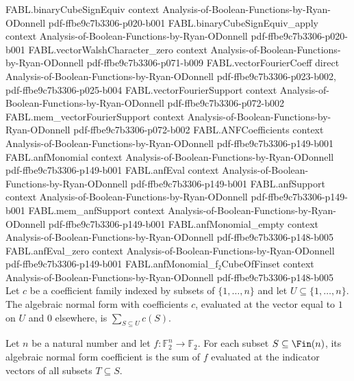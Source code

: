 \begin{theorem}
\proofstep
  {FABL.binaryCubeSignEquiv}
  {context}
  {Analysis-of-Boolean-Functions-by-Ryan-ODonnell}
  {pdf-ffbe9c7b3306-p020-b001}
\proofstep
  {FABL.binaryCubeSignEquiv_apply}
  {context}
  {Analysis-of-Boolean-Functions-by-Ryan-ODonnell}
  {pdf-ffbe9c7b3306-p020-b001}
\proofstep
  {FABL.vectorWalshCharacter_zero}
  {context}
  {Analysis-of-Boolean-Functions-by-Ryan-ODonnell}
  {pdf-ffbe9c7b3306-p071-b009}
\proofstep
  {FABL.vectorFourierCoeff}
  {direct}
  {Analysis-of-Boolean-Functions-by-Ryan-ODonnell}
  {pdf-ffbe9c7b3306-p023-b002,
    pdf-ffbe9c7b3306-p025-b004}
\proofstep
  {FABL.vectorFourierSupport}
  {context}
  {Analysis-of-Boolean-Functions-by-Ryan-ODonnell}
  {pdf-ffbe9c7b3306-p072-b002}
\proofstep
  {FABL.mem_vectorFourierSupport}
  {context}
  {Analysis-of-Boolean-Functions-by-Ryan-ODonnell}
  {pdf-ffbe9c7b3306-p072-b002}
\proofstep
  {FABL.ANFCoefficients}
  {context}
  {Analysis-of-Boolean-Functions-by-Ryan-ODonnell}
  {pdf-ffbe9c7b3306-p149-b001}
\proofstep
  {FABL.anfMonomial}
  {context}
  {Analysis-of-Boolean-Functions-by-Ryan-ODonnell}
  {pdf-ffbe9c7b3306-p149-b001}
\proofstep
  {FABL.anfEval}
  {context}
  {Analysis-of-Boolean-Functions-by-Ryan-ODonnell}
  {pdf-ffbe9c7b3306-p149-b001}
\proofstep
  {FABL.anfSupport}
  {context}
  {Analysis-of-Boolean-Functions-by-Ryan-ODonnell}
  {pdf-ffbe9c7b3306-p149-b001}
\proofstep
  {FABL.mem_anfSupport}
  {context}
  {Analysis-of-Boolean-Functions-by-Ryan-ODonnell}
  {pdf-ffbe9c7b3306-p149-b001}
\proofstep
  {FABL.anfMonomial_empty}
  {context}
  {Analysis-of-Boolean-Functions-by-Ryan-ODonnell}
  {pdf-ffbe9c7b3306-p148-b005}
\proofstep
  {FABL.anfEval_zero}
  {context}
  {Analysis-of-Boolean-Functions-by-Ryan-ODonnell}
  {pdf-ffbe9c7b3306-p149-b001}
\proofstep
  {FABL.anfMonomial_f₂CubeOfFinset}
  {context}
  {Analysis-of-Boolean-Functions-by-Ryan-ODonnell}
  {pdf-ffbe9c7b3306-p148-b005}
Let $c$ be a coefficient family indexed by subsets of $\{1,\ldots,n\}$ and let
$U\subseteq\{1,\ldots,n\}$. The algebraic normal form with coefficients $c$, evaluated
at the vector equal to $1$ on $U$ and $0$ elsewhere, is $\sum_{S\subseteq U}c(S)$.
\end{theorem}

\begin{definition}
\label{FABL.anfCoeff}
\leanok
{}
Let $n$ be a natural number and let $f:\mathbb{F}_2^n\to\mathbb{F}_2$. For each subset $S\subseteq\Fin(n)$,
its algebraic normal form coefficient is the sum of $f$ evaluated at the indicator
vectors of all subsets $T\subseteq S$.
\end{definition}


